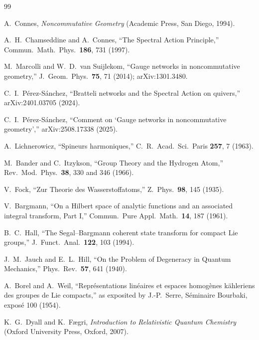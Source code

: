 \documentclass[twocolumn,pra,amsmath,amssymb,superscriptaddress]{revtex4-2}
\begin{document}
\begin{thebibliography}{99}

A.~Connes,
\textit{Noncommutative Geometry}
(Academic Press, San Diego, 1994).

A.~H.~Chamseddine and A.~Connes,
``The Spectral Action Principle,''
Commun.\ Math.\ Phys.\ \textbf{186}, 731 (1997).

M.~Marcolli and W.~D.~van Suijlekom,
``Gauge networks in noncommutative geometry,''
J.\ Geom.\ Phys.\ \textbf{75}, 71 (2014); arXiv:1301.3480.

C.~I.~P\'erez-S\'anchez,
``Bratteli networks and the Spectral Action on quivers,''
arXiv:2401.03705 (2024).

C.~I.~P\'erez-S\'anchez,
``Comment on `Gauge networks in noncommutative geometry','' arXiv:2508.17338 (2025).

A.~Lichnerowicz,
``Spineurs harmoniques,''
C.~R.\ Acad.\ Sci.\ Paris \textbf{257}, 7 (1963).

M.~Bander and C.~Itzykson,
``Group Theory and the Hydrogen Atom,''
Rev.\ Mod.\ Phys.\ \textbf{38}, 330 and 346 (1966).

V.~Fock,
``Zur Theorie des Wasserstoffatoms,''
Z.\ Phys.\ \textbf{98}, 145 (1935).

V.~Bargmann,
``On a Hilbert space of analytic functions and an associated
integral transform, Part I,''
Commun.\ Pure Appl.\ Math.\ \textbf{14}, 187 (1961).

B.~C.~Hall,
``The Segal--Bargmann coherent state transform for compact Lie
groups,''
J.\ Funct.\ Anal.\ \textbf{122}, 103 (1994).

J.~M.~Jauch and E.~L.~Hill,
``On the Problem of Degeneracy in Quantum Mechanics,''
Phys.\ Rev.\ \textbf{57}, 641 (1940).

A.~Borel and A.~Weil,
``Repr\'esentations lin\'eaires et espaces homog\`enes
k\"ahleriens des groupes de Lie compacts,''
as exposited by J.-P.~Serre, S\'eminaire Bourbaki, expos\'e 100 (1954).

K.~G.~Dyall and K.~F\ae gri,
\textit{Introduction to Relativistic Quantum Chemistry}
(Oxford University Press, Oxford, 2007).


\end{thebibliography}
\end{document}
